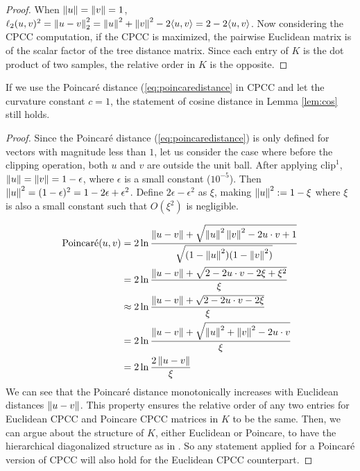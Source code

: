 \begin{proof}
    When $\left\lVert u\right\rVert = \left\lVert v\right\rVert = 1$, $\ell_2(u,v)^2 = \left\lVert u-v\right\rVert_2^2 = \left\lVert u\right\rVert^2 + \left\lVert v\right\rVert^2 - 2\langle u,v\rangle = 2 - 2\langle u,v\rangle$. Now considering the CPCC computation, if the CPCC is maximized, the pairwise Euclidean matrix is of the scalar factor of the tree distance matrix. Since each entry of $K$ is the dot product of two samples, the relative order in $K$ is the opposite. 
\end{proof}

\begin{corollary}
    If we use the Poincaré distance (\cref{eq:poincaredistance} in CPCC and let the curvature constant $c = 1$, the statement of cosine distance in Lemma \ref{lem:cos} still holds.
    \label{cor:poi}
\end{corollary}
\begin{proof}
Since the Poincaré distance (\cref{eq:poincaredistance}) is only defined for vectors with magnitude less than $1$, let us consider the case where before the clipping operation, both $u$ and 
$v$ are outside the unit ball. After applying $\text{clip}^1$, $\left\lVert u\right\rVert = \left\lVert v\right\rVert = 1 - \epsilon$, where $\epsilon$ is a small constant ($10^{-5}$). Then $\left\lVert u\right\rVert^2 = (1 - \epsilon)^2 = 1 - 2\epsilon + \epsilon^2$. Define $2\epsilon - \epsilon^2$ as $\xi$, making $\left\lVert u\right\rVert^2 := 1 - \xi$ where $\xi$ is also a small constant such that $O(\xi^2)$ is negligible.

\begin{align*}
    \textnormal{Poincaré}(u,v) &= 2\ln\frac{\left\lVert u - v\right\rVert + \sqrt{\left\lVert u\right\rVert^2\left\lVert v\right\rVert^2 - 2 u \cdot v + 1}}{\sqrt{(1 - \left\lVert u\right\rVert^2)(1 - \left\lVert v\right\rVert^2)}} \\
    &= 2\ln \frac{\left\lVert u - v\right\rVert + \sqrt{2 - 2u\cdot v - 2\xi + \xi^2}}{\xi} \\
    &\approx 2\ln \frac{\left\lVert u - v\right\rVert + \sqrt{2 - 2u\cdot v - 2\xi}}{\xi} \\
    &= 2\ln \frac{\left\lVert u - v\right\rVert + \sqrt{\left\lVert u\right\rVert^2 + \left\lVert v\right\rVert^2 - 2u\cdot v}}{\xi} \\
    &= 2\ln \frac{2\left\lVert u - v\right\rVert}{\xi}
\end{align*}
We can see that the Poincaré distance monotonically increases with Euclidean distances $\left\lVert u-v\right\rVert$. This property ensures the relative order of any two entries for Euclidean CPCC and Poincare CPCC matrices in $K$ to be the same. Then, we can argue about the structure of $K$, either Euclidean or Poincare, to have the hierarchical diagonalized structure as in . So any statement applied for a Poincaré version of CPCC will also hold for the Euclidean CPCC counterpart.
\end{proof}

